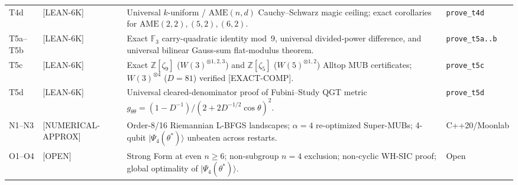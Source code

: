\documentclass[11pt,reqno]{amsart}
\theoremstyle{definition}
\newcommand{\F}{\mathbb{F}}
\newcommand{\Z}{\mathbb{Z}}
\newcommand{\taglean}{\textsf{[LEAN-6K]}}
\newcommand{\tagcomp}{\textsf{[EXACT-COMP]}}
\newcommand{\tagnum}{\textsf{[NUMERICAL-APPROX]}}
\newcommand{\tagopen}{\textsf{[OPEN]}}
\begin{document}
\begin{table}[htbp]
\begin{tabularx}{\textwidth}{@{}l l L l@{}}
T4d & \taglean & Universal $k$-uniform / $\mathrm{AME}(n,d)$ Cauchy--Schwarz magic ceiling; exact corollaries for $\mathrm{AME}(2,2),(5,2),(6,2)$. & \texttt{prove\_t4d} \\
T5a--T5b & \taglean & Exact $\F_3$ carry-quadratic identity mod~9, universal divided-power difference, and universal bilinear Gauss-sum flat-modulus theorem. & \texttt{prove\_t5a..b} \\
T5c & \taglean & Exact $\Z[\zeta_9]$ ($W(3)^{\otimes 1,2,3}$) and $\Z[\zeta_5]$ ($W(5)^{\otimes 1,2}$) Alltop MUB certificates; $W(3)^{\otimes 4}$ ($D=81$) verified \tagcomp. & \texttt{prove\_t5c} \\
T5d & \taglean & Universal cleared-denominator proof of Fubini--Study QGT metric $g_{\theta\theta}=(1-D^{-1})/(2+2D^{-1/2}\cos\theta)^2$. & \texttt{prove\_t5d} \\
N1--N3 & \tagnum & Order-8/16 Riemannian L-BFGS landscapes; $\alpha=4$ re-optimized Super-MUBs; 4-qubit $|\Psi_4(\theta^*)\rangle$ unbeaten across restarts. & C++20/Moonlab \\
O1--O4 & \tagopen & Strong Form at even $n\ge 6$; non-subgroup $n=4$ exclusion; non-cyclic WH-SIC proof; global optimality of $|\Psi_4(\theta^*)\rangle$. & Open \\
\bottomrule
\end{tabularx}
\end{table}
\end{document}
